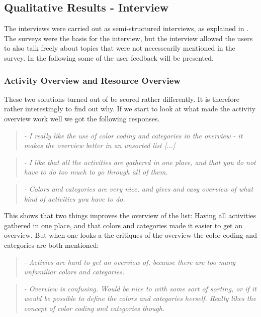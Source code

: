 \subsection{Qualitative Results - Interview}
The interviews were carried out as semi-structured interviews, as explained in \citet{ugur2001}. The surveys were the basis for the interview, but the interview allowed the users to also talk freely about topics that were not necessearily mentioned in the survey. In the following some of the user feedback will be presented.

\subsubsection{Activity Overview and Resource Overview}
\label{sec:resultActivity}
These two solutions turned out of be scored rather differently. It is therefore rather interestingly to find out why.
If we start to look at what made the activity overview work well we got the following responses.

\begin{quotation}
	\emph{
		- I really like the use of color coding and categories in the overview - it makes the overview better in an unsorted list [...]
	}
\end{quotation}

\begin{quotation}
	\emph{
		- I like that all the activities are gathered in one place, and that you do not have to do too much to go through all of them.
	}
\end{quotation}

\begin{quotation}
	\emph{
		- Colors and categories are very nice, and gives and easy overview of what kind of activities you have to do.
	}
\end{quotation}

This shows that two things improves the overview of the list: Having all activities gathered in one place, and that colors and categories made it easier to get an overview. But when one looks a the critiques of the overview the color coding and categories are both mentioned:

\begin{quotation}
	\emph{
		- Activies are hard to get an overview of, because there are too many unfamiliar colors and categories.
	}
\end{quotation}

\begin{quotation}
	\emph{
		- Overview is confusing. Would be nice to with some sort of sorting, or if it would be possible to define the colors and categories herself. Really likes the concept of color coding and categories though.
	}
\end{quotation}

